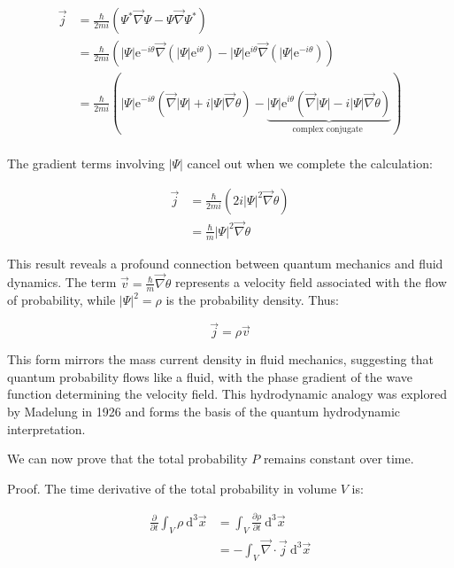 \documentclass[italian]{HKNdocument}
\begin{document}
\begin{align*}
\vec{j} &= \frac{\hbar}{2 m i}\left(\Psi^{*} \vec{\nabla} \Psi-\Psi \vec{\nabla} \Psi^{*}\right) \\
&= \frac{\hbar}{2 m i}\left(|\Psi| \mathrm{e}^{-i \theta} \vec{\nabla}\left(|\Psi| \mathrm{e}^{i \theta}\right)-|\Psi| \mathrm{e}^{i \theta} \vec{\nabla}\left(|\Psi| \mathrm{e}^{-i \theta}\right)\right) \\
&= \frac{\hbar}{2 m i}(|\Psi| \mathrm{e}^{-i \theta}(\vec{\nabla}|\Psi|+i|\Psi| \vec{\nabla} \theta)-\underbrace{|\Psi| \mathrm{e}^{i \theta}(\vec{\nabla}|\Psi|-i|\Psi| \vec{\nabla} \theta)}_{\text {complex conjugate }}) \tag{1.35} \\
\end{align*}

The gradient terms involving $|\Psi|$ cancel out when we complete the calculation:

\begin{align*}
\vec{j} &= \frac{\hbar}{2 m i}\left(2 i|\Psi|^{2} \vec{\nabla} \theta\right) \\
&= \frac{\hbar}{m}|\Psi|^{2} \vec{\nabla} \theta
\end{align*}

This result reveals a profound connection between quantum mechanics and fluid dynamics. The term $\vec{v}=\frac{\hbar}{m} \vec{\nabla} \theta$ represents a velocity field associated with the flow of probability, while $|\Psi|^2 = \rho$ is the probability density. Thus:

\begin{equation*}
\vec{j}=\rho \vec{v} \tag{1.36}
\end{equation*}

This form mirrors the mass current density in fluid mechanics, suggesting that quantum probability flows like a fluid, with the phase gradient of the wave function determining the velocity field. This hydrodynamic analogy was explored by Madelung in 1926 and forms the basis of the quantum hydrodynamic interpretation.

We can now prove that the total probability $P$ remains constant over time.

Proof. The time derivative of the total probability in volume $V$ is:

\begin{align*}
\frac{\partial}{\partial t} \int_{V} \rho \mathrm{~d}^{3} \vec{x} &= \int_{V} \frac{\partial \rho}{\partial t} \mathrm{~d}^{3} \vec{x} \tag{1.37} \\
&= -\int_{V} \vec{\nabla} \cdot \vec{j} \mathrm{~d}^{3} \vec{x}
\end{align*}
\end{document}
